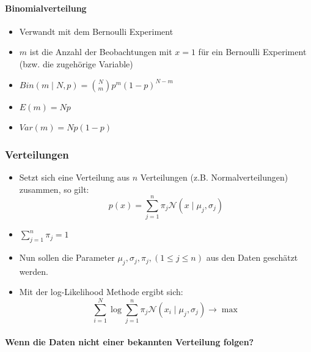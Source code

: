 \documentclass{scrartcl}
\begin{document}
\paragraph{Binomialverteilung}

\begin{itemize}
	\item Verwandt mit dem Bernoulli Experiment
	\item $ m $ ist die Anzahl der Beobachtungen mit $ x=1 $ für ein Bernoulli 
	Experiment (bzw. die zugehörige Variable)
	\item $ Bin(m \mid N,p) = \binom{N}{m} p^m (1-p)^{N-m} $
	\item $ E(m) = Np $
	\item $ Var(m) = Np(1-p) $
\end{itemize}

\subsubsection{Verteilungen}

\begin{itemize}
	\item Setzt sich eine Verteilung aus $ n $ Verteilungen (z.B. 
	Normalverteilungen) zusammen, so gilt:
	\[ p(x) = \sum_{j=1}^{n} \pi_j \mathcal{N} (x \mid \mu_j, \sigma_j) \]
	\item $ \sum_{j=1}^{n} \pi_j = 1 $
	\item Nun sollen die Parameter $ \mu_j, \sigma_j, \pi_j, (1 \leq j \leq n) 
	$ aus den Daten geschätzt werden.
	\item Mit der log-Likelihood Methode ergibt sich:
	\[ \sum_{i=1}^{N} \log  \sum_{j=1}^{n} \pi_j \mathcal{N} (x_i \mid \mu_j, 
	\sigma_j) \rightarrow \max \]
\end{itemize}

\paragraph{Wenn die Daten nicht einer bekannten Verteilung folgen?}
\end{document}

